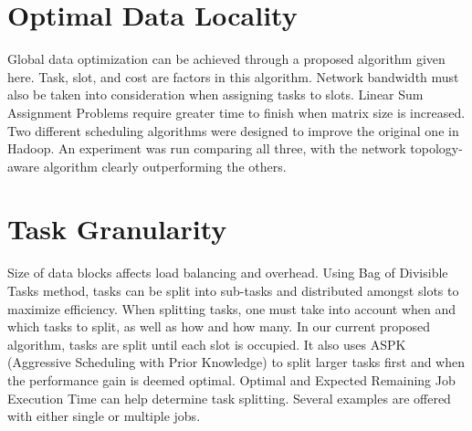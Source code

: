 


\section{Optimal Data Locality}

Global data optimization can be achieved through a proposed algorithm
given here. Task, slot, and cost are factors in this algorithm. Network
bandwidth must also be taken into consideration when assigning tasks to
slots. Linear Sum Assignment Problems require greater time to finish
when matrix size is increased. Two different scheduling algorithms were
designed to improve the original one in Hadoop. An experiment was run
comparing all three, with the network topology-aware algorithm clearly
outperforming the others.



\section{Task Granularity}

Size of data blocks affects load balancing and overhead. Using Bag of
Divisible Tasks method, tasks can be split into sub-tasks and
distributed amongst slots to maximize efficiency. When splitting tasks,
one must take into account when and which tasks to split, as well as how
and how many. In our current proposed algorithm, tasks are split until
each slot is occupied. It also uses ASPK (Aggressive Scheduling with
Prior Knowledge) to split larger tasks first and when the performance
gain is deemed optimal. Optimal and Expected Remaining Job Execution
Time can help determine task splitting. Several examples are offered
with either single or multiple jobs.


